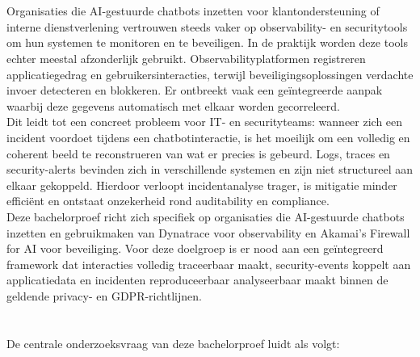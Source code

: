 \section{}%
\label{sec:probleemstelling}

Organisaties die AI-gestuurde chatbots inzetten voor klantondersteuning of interne dienstverlening vertrouwen steeds vaker op observability- en securitytools om hun systemen te monitoren en te beveiligen. In de praktijk worden deze tools echter meestal afzonderlijk gebruikt. Observabilityplatformen registreren applicatiegedrag en gebruikersinteracties, terwijl beveiligingsoplossingen verdachte invoer detecteren en blokkeren. Er ontbreekt vaak een geïntegreerde aanpak waarbij deze gegevens automatisch met elkaar worden gecorreleerd.\\

Dit leidt tot een concreet probleem voor IT- en securityteams: wanneer zich een incident voordoet tijdens een chatbotinteractie, is het moeilijk om een volledig en coherent beeld te reconstrueren van wat er precies is gebeurd. Logs, traces en security-alerts bevinden zich in verschillende systemen en zijn niet structureel aan elkaar gekoppeld. Hierdoor verloopt incidentanalyse trager, is mitigatie minder efficiënt en ontstaat onzekerheid rond auditability en compliance.\\

Deze bachelorproef richt zich specifiek op organisaties die AI-gestuurde chatbots inzetten en gebruikmaken van Dynatrace voor observability en Akamai’s Firewall for AI voor beveiliging. Voor deze doelgroep is er nood aan een geïntegreerd framework dat interacties volledig traceerbaar maakt, security-events koppelt aan applicatiedata en incidenten reproduceerbaar analyseerbaar maakt binnen de geldende privacy- en GDPR-richtlijnen.\\



\section{}%
\label{sec:onderzoeksvraag}

De centrale onderzoeksvraag van deze bachelorproef luidt als volgt:

